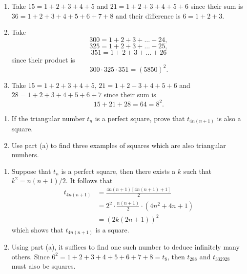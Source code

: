 \begin{solution}
    \begin{enumerate}
        \item Take $15 = 1 + 2 + 3 + 4 + 5$ and $21 = 1 + 2 + 3 + 4 + 5 + 6$ since their sum is $36 = 1 + 2 + 3 + 4 + 5 + 6 + 7 + 8$ and their difference is $6 = 1 + 2 + 3$. 
        \item Take 
        $$300 = 1 + 2 + 3 + \dots + 24,$$
        $$325 = 1 + 2 + 3 + \dots + 25,$$
        $$351 = 1 + 2 + 3 + \dots + 26$$
        since their product is
        $$300 \cdot 325 \cdot 351 = (5850)^2.$$
        \item Take $15 = 1 + 2 + 3 + 4 + 5$, $21 = 1 + 2 + 3 + 4 + 5 + 6$ and $28 = 1 + 2 + 3 + 4 + 5 + 6 + 7$ since their sum is
        $$15 + 21 + 28 = 64 = 8^2.$$
    \end{enumerate}
\end{solution}

\begin{exercise}
    \begin{enumerate}
        \item If the triangular number $t_n$ is a perfect square, prove that $t_{4n(n+1)}$ is also a square.
        \item Use part (a) to find three examples of squares which are also triangular numbers. 
    \end{enumerate}
\end{exercise}

\begin{solution}
    \begin{enumerate}
        \item Suppose that $t_n$ is a perfect square, then there exists a $k$ such that $k^2 = n(n+1)/2$. It follows that
        \begin{align*}
            t_{4n(n+1)} &= \frac{4n(n+1)[4n(n+1) + 1]}{2} \\
            &= 2^2 \cdot \frac{n(n+1)}{2} \cdot (4n^2 + 4n + 1) \\
            &= (2k(2n+1))^2
        \end{align*}
        which shows that $t_{4n(n+1)}$ is a square.
        \item Using part (a), it suffices to find one such number to deduce infinitely many others. Since $6^2 = 1+ 2 + 3 +4 + 5 + 6 + 7 + 8 = t_8$, then $t_{288}$ and $t_{332928}$ must also be squares. 
    \end{enumerate}
\end{solution}

